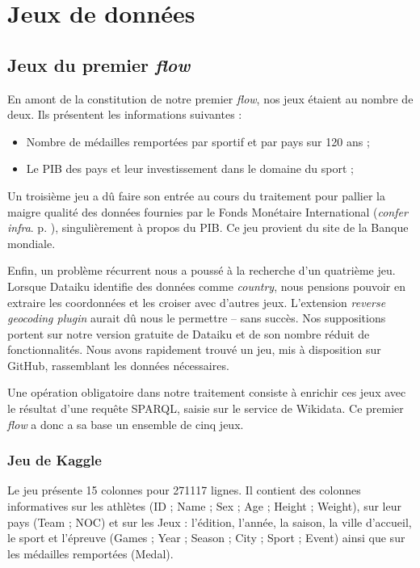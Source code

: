 \documentclass[hidelinks, 12pt]{article}
\begin{document}
\section{Jeux de données}

\subsection{Jeux du premier \emph{flow}}

En amont de la constitution de notre premier \emph{flow}, nos jeux étaient au nombre de deux. Ils présentent les informations suivantes :
\begin{itemize}
	\item Nombre de médailles remportées par sportif et par pays sur 120 ans\autocite{kaggle} ;
	\item Le PIB des pays et leur investissement dans le domaine du sport\autocite{fmi} ;
\end{itemize}

Un troisième jeu a dû faire son entrée au cours du traitement pour pallier la maigre qualité des données fournies par le Fonds Monétaire International (\emph{confer infra}. p. \pageref{banquemondiale}), singulièrement à propos du PIB. Ce jeu provient du site de la Banque mondiale\autocite{worldbank}.

Enfin, un problème récurrent nous a poussé à la recherche d'un quatrième jeu. Lorsque Dataiku identifie des données comme \emph{country}, nous pensions pouvoir en extraire les coordonnées et les croiser avec d'autres jeux. L'extension \emph{reverse geocoding plugin} aurait dû nous le permettre -- sans succès. Nos suppositions portent sur notre version gratuite de Dataiku et de son nombre réduit de fonctionnalités. Nous avons rapidement trouvé un jeu, mis à disposition sur GitHub\autocite{github}, rassemblant les données nécessaires.

Une opération obligatoire dans notre traitement consiste à enrichir ces jeux avec le résultat d'une requête SPARQL, saisie sur le service de Wikidata. Ce premier \emph{flow} a donc a sa base un ensemble de cinq jeux.





\subsubsection{Jeu de Kaggle}

Le jeu présente 15 colonnes pour 271117 lignes. Il contient des colonnes informatives sur les athlètes (ID ; Name ; Sex ; Age ; Height ; Weight), sur leur pays (Team ; NOC) et sur les Jeux : l'édition, l'année, la saison, la ville d'accueil, le sport et l'épreuve (Games ; Year ; Season ; City ; Sport ; Event) ainsi que sur les médailles remportées (Medal).
\end{document}
